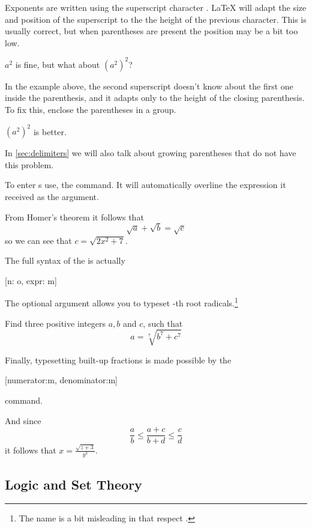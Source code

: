 Exponents are written using the superscript character \ai{\^{}}.
\LaTeX{} will adapt the size and position of the superscript to the
the height of the previous character. This is usually correct, but when
parentheses are present the position may be a bit too low.
\begin{example}
\( a^2 \) is fine, but what
about \( (a^2)^2 \)?
\end{example}
In the example above, the second superscript doesn't know about the first one
inside the parenthesis, and it adapts only to the height of the closing
parenthesis. To fix this, enclose the parentheses in a group.
\begin{example}
\( {(a^2)}^2 \) is better.
\end{example}
In \autoref{sec:delimiters} we will also talk about growing parentheses that do
not have this problem.

To enter s use, the  command. It will automatically
overline the expression it received as the argument.
\begin{example}
From Homer's theorem it
follows that
\[
  \sqrt{a} + \sqrt{b} = \sqrt{c}
\]
so we can see that
\(c = \sqrt{2x^2+7}\).
\end{example}
The full syntax of the  is actually
\begin{lscommand}
  [n: o, expr: m]
\end{lscommand}
The optional argument  allows you to typeset -th root
radicals.\footnote{The name  is a bit misleading in that respect
  \smiley.}
\begin{example}
Find three positive integers
\(a, b\) and \(c\), such that
\[
  a = \sqrt[7]{b^7 + c^7}
\]
\end{example}

Finally, typesetting built-up fractions is made possible by the
\begin{lscommand}
  [numerator:m, denominator:m]
\end{lscommand}
command.
\begin{example}
And since
\[
  \frac{a}{b} \leq
  \frac{a+c}{b+d} \leq
  \frac{c}{d}
\]
it follows that
\(x = \frac{\sqrt{z+3}}{y^3}\).
\end{example}

\subsection{Logic and Set Theory}

